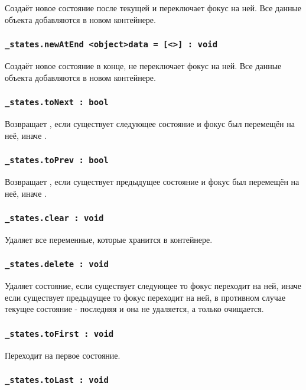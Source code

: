 \documentclass[a4paper, 14pt]{extarticle}
\begin{document}
Создаёт новое состояние после текущей и переключает фокус на ней. Все данные объекта  добавляются в новом контейнере.

\subsubsection{\lstinline|_states.newAtEnd <object>data = [<>] : void|}

Создаёт новое состояние в конце, не переключает фокус на ней. Все данные объекта  добавляются в новом контейнере.

\subsubsection{\lstinline|_states.toNext : bool|}

Возвращает \true, если существует следующее состояние и фокус был перемещён на неё, иначе \false.

\subsubsection{\lstinline|_states.toPrev : bool|}

Возвращает \true, если существует предыдущее состояние и фокус был перемещён на неё, иначе \false.

\subsubsection{\lstinline|_states.clear : void|}

Удаляет все переменные, которые хранится в контейнере.

\subsubsection{\lstinline|_states.delete : void|}

Удаляет состояние, если существует следующее то фокус переходит на ней, иначе если существует предыдущее то фокус переходит на ней, в противном случае текущее состояние - последняя и она не удаляется, а только очищается.

\subsubsection{\lstinline|_states.toFirst : void|}

Переходит на первое состояние.

\subsubsection{\lstinline|_states.toLast : void|}
\end{document}
